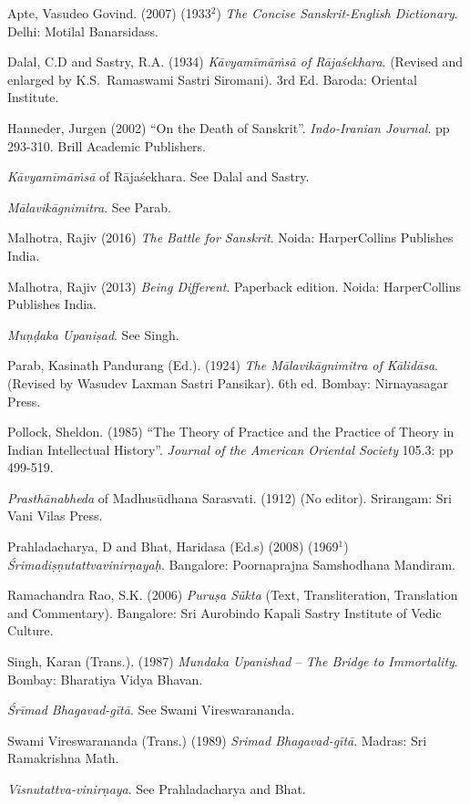 \begin{thebibliography}{99}
\itemsep=2pt
Apte, Vasudeo Govind. (2007) (1933$^{2}$) \textit{The Concise Sanskrit-English Dictionary}. Delhi: Motilal Banarsidass.

Dalal, C.D and Sastry, R.A. (1934) \textit{Kāvyamīmāṁsā of Rājaśekhara}. (Revised and enlarged by K.S.~Ramaswami Sastri Siromani). 3rd Ed. Baroda: Oriental Institute.

Hanneder, Jurgen (2002) ``On the Death of Sanskrit''. \textit{Indo-Iranian Journal}. pp 293-310. Brill Academic Publishers. 

\textit{Kāvyamīmāṁsā} of Rājaśekhara. See Dalal and Sastry. 

\textit{Mālavikāgnimitra}. See Parab. 

Malhotra, Rajiv (2016) \textit{The Battle for Sanskrit}. Noida: HarperCollins Publishes India.

Malhotra, Rajiv (2013) \textit{Being Different}. Paperback edition. Noida: HarperCollins Publishes India.

\textit{Muṇḍaka Upaniṣad}. See Singh. 

Parab, Kasinath Pandurang (Ed.). (1924) \textit{The Mālavikāgnimitra of Kālidāsa}. (Revised by Wasudev Laxman Sastri Pansikar). 6th ed. Bombay: Nirnayasagar Press.

Pollock, Sheldon. (1985) ``The Theory of Practice and the Practice of Theory in Indian Intellectual History''. \textit{Journal of the American Oriental Society} 105.3: pp 499-519.

{\it Prasthānabheda} of Madhusūdhana Sarasvati. (1912) (No editor). Srirangam: Sri Vani Vilas Press.

Prahladacharya, D and Bhat, Haridasa (Ed.s) (2008) (1969$^{1}$) \textit{Śrimadiṣṇutattvavinirṇayaḥ}. Bangalore: Poornaprajna Samshodhana Mandiram.

Ramachandra Rao, S.K. (2006) \textit{Puruṣa Sūkta} (Text, Transliteration, Translation and Commentary). Bangalore: Sri Aurobindo Kapali Sastry Institute of Vedic Culture. 

Singh, Karan (Trans.). (1987) \textit{Mundaka Upanishad} -- \textit{The Bridge to Immortality}. Bombay: Bharatiya Vidya Bhavan.

\textit{Śrīmad Bhagavad-gītā}. See Swami Vireswarananda. 

Swami Vireswarananda (Trans.) (1989) \textit{Srimad Bhagavad-gītā}. Madras: Sri Ramakrishna Math.

\textit{Visnutattva-vinirṇaya}. See Prahladacharya and Bhat.
\end{thebibliography}
